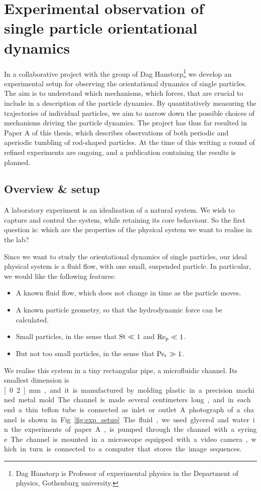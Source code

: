 \documentclass[thesis.tex]{subfiles}
\begin{document}
\chapter{Experimental observation of \\single particle orientational dynamics}

In a collaborative project with the group of Dag Hanstorp\footnote{Dag Hanstorp is Professor of experimental physics in the Department of physics, Gothenburg university.} we develop an experimental setup for observing the orientational dynamics of single particles. The aim is to understand which mechanisms, which forces, that are crucial to include in a description of the particle dynamics. By quantitatively measuring the trajectories of individual particles, we aim to narrow down the possible choices of mechanisms driving the particle dynamics. The project has thus far resulted in Paper A of this thesis, which describes observations of both periodic and aperiodic tumbling of rod-shaped particles. At the time of this writing a round of refined experiments are ongoing, and a publication containing the results is planned.

\section{Overview \& setup}

A laboratory experiment is an idealisation of a natural system. We wish to capture and control the system, while retaining its core behaviour. So the first question is: which are the properties of the physical system we want to realise in the lab?

Since we want to study the orientational dynamics of single particles, our ideal physical system is a fluid flow, with one small, suspended particle. In particular, we would like the following features:
\begin{itemize}
	\item A known fluid flow, which does not change in time as the particle moves.
	\item A known particle geometry, so that the hydrodynamic force can be calculated.
	\item Small particles, in the sense that $\mbox{St}\ll1$ and $\mbox{Re}_{\mathrm p}\ll1$.
	\item But not too small particles, in the sense that $\mbox{Pe}_{\mathrm r}\gg1$.
\end{itemize}
We realise this system in a tiny rectangular pipe, a microfluidic channel. Its smallest dimension is \unit[0.2]{mm}, and it is manufactured by molding plastic in a precision machined metal mold. The channel is made several centimeters long, and in each end a thin teflon tube is connected as inlet or outlet. A photograph of a channel is shown in Fig.~\ref{fig:exp_setup}. The fluid, we used glycerol and water in the experiments of paper A, is pumped through the channel with a syringe. The channel is mounted in a microscope equipped with a video camera, which in turn is connected to a computer that stores the image sequences.
\end{document}
